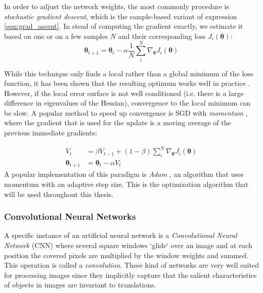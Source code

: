 In order to adjust the network weights, the most commonly procedure is \emph{stochastic gradient descent}, which is the sample-based variant of expression \ref{eqn:grad_ascent}. In stead of computing the gradient exactly, we estimate it based on one or on a few samples $N$ and their corresponding loss $J_{i}(\bm{\theta})$: 
\begin{equation}
    \label{eqn:sgd}
    \bm{\theta}_{t+1} = \bm{\theta}_{t} - \alpha \frac{1}{N} \sum_{i}^{N} \nabla_{\bm{\theta}} J_{i}(\bm{\theta})
\end{equation}

While this technique only finds a local rather than a global minimum of the loss function, it has been shown that the resulting optimum works well in practice \cite{bottou2010large}.  However, if the local error surface is not well conditioned (i.e. there is a large difference in eigenvalues of the Hessian), convergence to the local minimum can be slow. A popular method to speed up convergence is SGD with \emph{momentum} \cite{qian1999momentum}, where the gradient that is used for the update is a moving average of the previous immediate gradients:

\begin{align*}
        V_t &= \beta V_{t-1} + (1-\beta) \sum_{i}^{N} \nabla_{\bm{\theta}} J_{i}(\bm{\theta})\\
        \bm{\theta}_{t+1} &= \bm{\theta}_{t} - \alpha V_t
\end{align*}
A popular implementation of this paradigm is \emph{Adam} \cite{kingma2014adam}, an algorithm that uses momentum with an adaptive step size. This is the optimization algorithm that will be used throughout this thesis.

\subsubsection{Convolutional Neural Networks}
A specific instance of an artificial neural network is a \emph{Convolutional Neural Network} (CNN) \cite{lecun1989backpropagation} where several square windows `glide` over an image and at each position the covered pixels are multiplied by the window weights and summed. This operation is called a \emph{convolution}. These kind of networks are very well suited for processing images since they implicitly capture that the salient characteristics of objects in images are invariant to translations.\\

